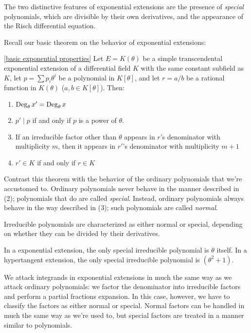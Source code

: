 
\setcounter{chapter}{5}

The two distinctive features of exponential extensions are the presence
of {\it special} polynomials, which are divisible by their own
derivatives, and the appearance of the Risch differential equation.

Recall our basic theorem on the behavior of exponential extensions:

\begin{customthm}{\ref{basic exponential properties}}
Let $E=K(\theta)$ be a simple transcendental exponential extension of
a differential field $K$ with the same constant subfield as $K$,
let $p=\sum p_i \theta^i$ be a polynomial in $K[\theta]$,
and let $r=a/b$ be a rational function in $K(\theta)$
($a, b \in K[\theta]$).  Then:

\begin{enumerate}
\item ${\rm Deg}_\theta\, x' = {\rm Deg}_\theta\, x$
\item $p' \mid p$ if and only if $p$ is a power of $\theta$.
\item If an irreducible factor other than $\theta$ appears in $r$'s
denominator with multiplicity $m$,
then it appears in $r'$'s denominator with multiplicity $m+1$
\item $r' \in K$ if and only if $r \in K$
\end{enumerate}

\end{customthm}

Contrast this theorem with the behavior of the ordinary polynomials
that we're accustomed to.  Ordinary polynomials never behave in the
manner described in (2); polynomials that do are called {\it special}.
Instead, ordinary polynomials always behave in the way described in
(3); such polynomials are called {\it normal}.

Irreducible polynomials are characterized as either normal
or special, depending on whether they can be divided by
their derivatives.

In a exponential extension, the only special irreducible polynomial is
$\theta$ itself.  In a hypertangent extension, the only special
irreducible polynomial is $(\theta^2+1)$.

We attack integrands in exponential extensions in much the same way as
we attack ordinary polynomials: we factor the denominator into
irreducible factors and perform a partial fractions expansion.  In
this case, however, we have to classify the factors as either normal
or special.  Normal factors can be handled in much the same way as
we're used to, but special factors are treated in a manner similar to
polynomials.

